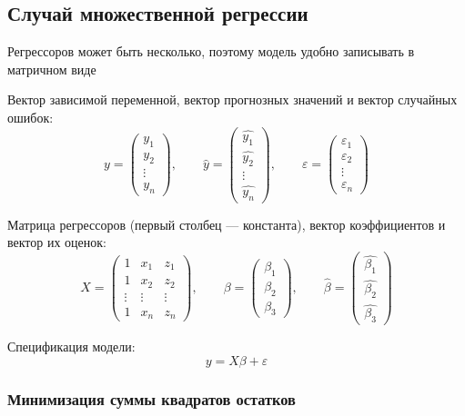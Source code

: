 \documentclass[12pt,a4paper]{article}
\numberwithin{equation}{section}
\theoremstyle{plain}
\theoremstyle{definition}
\theoremstyle{remark}
\begin{document}
\subsection{Случай множественной регрессии}

Регрессоров может быть несколько, поэтому модель удобно записывать в матричном виде

Вектор зависимой переменной, вектор прогнозных значений и вектор случайных ошибок:
$$
    y = \begin{pmatrix} y_1 \\ y_2 \\ \vdots \\ y_n \end{pmatrix}, \qquad
    \hat{y} = \begin{pmatrix} \hat{y_1} \\ \hat{y_2} \\ \vdots \\ \hat{y_n} \end{pmatrix}, \qquad
    \varepsilon = \begin{pmatrix} \varepsilon_1 \\ \varepsilon_2 \\ \vdots \\ \varepsilon_n \end{pmatrix}
$$

Матрица регрессоров (первый столбец — константа), вектор коэффициентов и вектор их оценок:
$$
    X = \begin{pmatrix}
        1      & x_1    & z_1    \\
        1      & x_2    & z_2    \\
        \vdots & \vdots & \vdots \\
        1      & x_n    & z_n
    \end{pmatrix}, \qquad
    \beta = \begin{pmatrix} \beta_1 \\ \beta_2 \\ \beta_3 \end{pmatrix}, \qquad
    \hat{\beta} = \begin{pmatrix} \hat{\beta_1} \\ \hat{\beta_2} \\ \hat{\beta_3} \end{pmatrix}
$$

Спецификация модели:
$$
    y = X\beta + \varepsilon
$$

\subsubsection{Минимизация суммы квадратов остатков}
\end{document}

